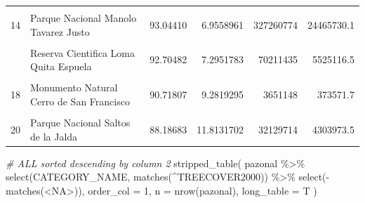 \documentclass[10pt,landscape,a3paper]{article}
\newenvironment{Shaded}{\begin{snugshade}}{\end{snugshade}}
\newcommand{\AttributeTok}[1]{\textcolor[rgb]{0.77,0.63,0.00}{#1}}
\newcommand{\CommentTok}[1]{\textcolor[rgb]{0.56,0.35,0.01}{\textit{#1}}}
\newcommand{\DecValTok}[1]{\textcolor[rgb]{0.00,0.00,0.81}{#1}}
\newcommand{\FunctionTok}[1]{\textcolor[rgb]{0.00,0.00,0.00}{#1}}
\newcommand{\NormalTok}[1]{#1}
\newcommand{\SpecialCharTok}[1]{\textcolor[rgb]{0.00,0.00,0.00}{#1}}
\newcommand{\StringTok}[1]{\textcolor[rgb]{0.31,0.60,0.02}{#1}}
\begin{document}
\begin{table}[H]
\begin{tabular}[t]{llrrrr}
\cellcolor{lightgray}{13} & \cellcolor{lightgray}{Reserva Forestal Loma Novillero} & \cellcolor{lightgray}{93.31888} & \cellcolor{lightgray}{6.6811206} & \cellcolor{lightgray}{12028318} & \cellcolor{lightgray}{861161.7}\\
14 & Parque Nacional Manolo Tavarez Justo & 93.04410 & 6.9558961 & 327260774 & 24465730.1\\
\cellcolor{lightgray}{15} & \cellcolor{lightgray}{Monumento Natural Diego de Ocampo} & \cellcolor{lightgray}{92.85590} & \cellcolor{lightgray}{7.1441013} & \cellcolor{lightgray}{23532983} & \cellcolor{lightgray}{1810569.0}\\
\addlinespace
16 & Reserva Cientifica Loma Quita Espuela & 92.70482 & 7.2951783 & 70211435 & 5525116.5\\
\cellcolor{lightgray}{17} & \cellcolor{lightgray}{Parque Nacional Picky Lora} & \cellcolor{lightgray}{92.31943} & \cellcolor{lightgray}{7.6805670} & \cellcolor{lightgray}{103652897} & \cellcolor{lightgray}{8623460.9}\\
18 & Monumento Natural Cerro de San Francisco & 90.71807 & 9.2819295 & 3651148 & 373571.7\\
\cellcolor{lightgray}{19} & \cellcolor{lightgray}{Reserva Forestal Alto Mao} & \cellcolor{lightgray}{89.03664} & \cellcolor{lightgray}{10.9633598} & \cellcolor{lightgray}{187078973} & \cellcolor{lightgray}{23035618.6}\\
20 & Parque Nacional Saltos de la Jalda & 88.18683 & 11.8131702 & 32129714 & 4303973.5\\
\bottomrule
\end{tabular}
\end{table}

\begin{Shaded}
\begin{Highlighting}[]
\CommentTok{\# ALL sorted descending by column 2}
\FunctionTok{stripped\_table}\NormalTok{(}
\NormalTok{  pazonal }\SpecialCharTok{\%\textgreater{}\%} \FunctionTok{select}\NormalTok{(CATEGORY\_NAME, }\FunctionTok{matches}\NormalTok{(}\StringTok{\textquotesingle{}\^{}TREECOVER2000\textquotesingle{}}\NormalTok{)) }\SpecialCharTok{\%\textgreater{}\%} \FunctionTok{select}\NormalTok{(}\SpecialCharTok{{-}}\FunctionTok{matches}\NormalTok{(}\StringTok{\textquotesingle{}\textless{}NA\textgreater{}\textquotesingle{}}\NormalTok{)),}
  \AttributeTok{order\_col =} \DecValTok{1}\NormalTok{, }\AttributeTok{n =} \FunctionTok{nrow}\NormalTok{(pazonal),}
  \AttributeTok{long\_table =}\NormalTok{ T}
\NormalTok{)}
\end{Highlighting}
\end{Shaded}
\end{document}
